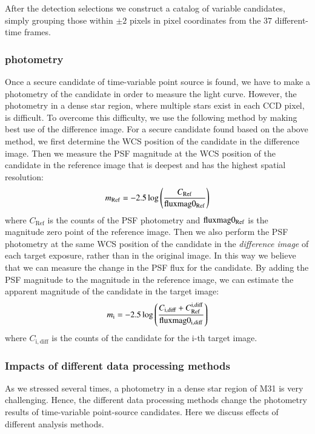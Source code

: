 \documentclass[iop, apj]{emulateapj}
\newcommand{\?}{\stackrel{?}{=}}
\begin{document}
After the detection selections we construct a catalog of variable candidates, 
simply grouping those within ${\pm 2}$ pixels in pixel coordinates from the $37$ different-time frames.  %


\subsubsection{photometry}
\label{sec:photometh}
Once a secure candidate of time-variable point source is found, we have to make a photometry of the candidate in order to measure the light curve. However, the photometry in a dense star region, where multiple stars exist in each CCD pixel, is difficult. To overcome this difficulty, we use the following method by making best use of the difference image. 
For a secure candidate found based on the above method, we first determine the WCS position of the candidate in the difference image. Then we measure the PSF magnitude at the WCS position of the candidate in the reference image that is deepest and has the highest spatial resolution: 
%
\begin{eqnarray}
m_{\rm Ref}=-2.5\log\left(\frac{C_\mathrm{Ref}}{\rm{fluxmag}0_{\rm Ref}}\right)
\end{eqnarray}
%
where $C_\mathrm{Ref}$ is the counts of the PSF photometry and $\rm{fluxmag}0_{\rm Ref}$ is the magnitude zero point of the reference image. Then we also perform the PSF photometry at the same WCS position of the candidate in the {\it  difference image} of each target exposure, rather than in the original image. In this way we believe that we can measure the change in the PSF flux for the candidate. By adding the PSF magnitude to the magnitude in the reference image, we can estimate the apparent magnitude of the candidate in the target image:
%
\begin{eqnarray}
m_{\rm i}=-2.5\log\left(\frac{C_\mathrm{i,diff}+C^{\rm i,diff}_{\rm Ref}}{\rm{fluxmag}0_{\rm i,diff}}\right)
\end{eqnarray}
%
where $C_\mathrm{i,diff}$ is the counts of the candidate for the i-th target image. 
%


\subsubsection{Impacts of different data processing methods}
\label{sec:methtest}
As we stressed several times, a photometry in a dense star region of M31 is very challenging. Hence, the different data processing methods change the photometry results of time-variable point-source candidates. Here we discuss effects of different analysis methods. 
\end{document}
